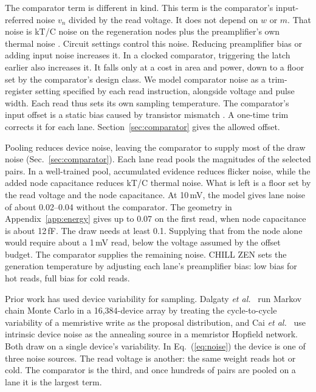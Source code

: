 \documentclass[reprint,amsmath,amssymb,aps,nofootinbib]{revtex4-2}
\begin{document}
The comparator term is different in kind. This term is the comparator's input-referred noise $v_n$ divided by the
read voltage. It does not depend on $w$ or $m$. That noise is kT/C noise on the
regeneration nodes plus the preamplifier's own thermal noise
\cite{razavi2015strongarm}. Circuit settings control this noise. Reducing preamplifier bias or
adding input noise increases it. In a clocked comparator, triggering the
latch earlier also increases it. It falls only at a cost in area and power,
down to a floor set by the comparator's design class. We model comparator noise as a trim-register setting specified by each
read instruction, alongside voltage and pulse width. Each read thus sets
its own sampling temperature. The comparator's input offset is a static bias caused by transistor
mismatch \cite{pelgrom1989matching}. A one-time trim corrects it for
each lane. Section~\ref{sec:comparator} gives the allowed offset.

Pooling reduces device noise, leaving the comparator to supply most of
the draw noise (Sec.~\ref{sec:comparator}). Each lane read pools the magnitudes of the selected pairs. In a
well-trained pool, accumulated evidence reduces flicker noise, while the
added node capacitance reduces kT/C thermal noise. What
is left is a floor set by the read voltage and the node capacitance.
At 10\,mV, the model gives lane noise of about 0.02--0.04 without the
comparator. The geometry in Appendix~\ref{app:energy} gives up to 0.07
on the first read, when node capacitance is about 12\,fF. The draw needs
at least 0.1. Supplying that from the node alone would require about a
1\,mV read, below the voltage assumed by the offset budget. The comparator supplies the remaining noise. CHILL ZEN sets the
generation temperature by adjusting each lane's preamplifier bias: low
bias for hot reads, full bias for cold reads.

Prior work has used device variability for sampling. Dalgaty \emph{et al.}\ \cite{dalgaty2021insitu} run
Markov chain Monte Carlo in a 16{,}384-device array by treating the
cycle-to-cycle variability of a memristive write as the proposal
distribution, and Cai \emph{et al.}\ \cite{cai2020hopfield} use
intrinsic device noise as the annealing source in a memristor Hopfield
network. Both draw on a single device's variability. In
Eq.~(\ref{eq:noise}) the device is one of three noise sources. The read
voltage is another: the same weight reads hot or cold. The comparator is the third, and
once hundreds of pairs are pooled on a lane it is the largest term.
\end{document}
